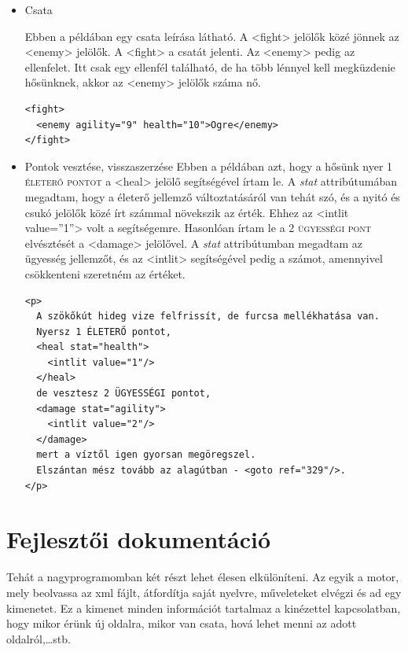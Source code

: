 \documentclass[12pt,a4paper,oneside]{report}
\newcommand{\xtag}[1]{{\color{Tag}#1}}
\newcommand{\stat}{\textsc}
\newcommand{\attr}{\emph}
\begin{document}
\begin{itemize}
      \item Csata
      
        Ebben a példában egy csata leírása látható. A
        <\xtag{fight}> jelölők közé jönnek az
        <\xtag{enemy}> jelölők. A <\xtag{fight}> a csatát
        jelenti. Az <\xtag{enemy}> pedig az ellenfelet. Itt csak egy ellenfél
        található, de ha több lénnyel kell megküzdenie hősünknek,
        akkor az <\xtag{enemy}> jelölők száma nő.
        \begin{verbatim}
<fight>
  <enemy agility="9" health="10">Ogre</enemy>
</fight>
        \end{verbatim}

      \item Pontok vesztése, visszaszerzése
        Ebben a példában azt, hogy a hősünk nyer 1 \stat{életerő pontot} a
        <\xtag{heal}> jelölő segítségével írtam le. A \attr{stat}
        attribútumában megadtam, hogy a életerő jellemző
        változtatásáról van tehát szó, és a nyitó és csukó jelölők közé írt
        számmal növekszik az érték. Ehhez az <\xtag{intlit}
        {\color{Attr}value}={\color{Value}''1''}> volt a segítségemre.
        Hasonlóan írtam le a 2 \stat{ügyességi pont} elvésztését a <\xtag{damage}>
        jelölővel. A \attr{stat} attribútumban megadtam az ügyesség
        jellemzőt, és az <\xtag{intlit}> segítségével pedig a számot,
        amennyivel csökkenteni szeretném az értéket.
        \begin{verbatim}
<p>
  A szökőkút hideg vize felfrissít, de furcsa mellékhatása van. 
  Nyersz 1 ÉLETERŐ pontot,
  <heal stat="health">
    <intlit value="1"/>
  </heal>      
  de vesztesz 2 ÜGYESSÉGI pontot,
  <damage stat="agility">
    <intlit value="2"/>
  </damage>            
  mert a víztől igen gyorsan megöregszel.
  Elszántan mész tovább az alagútban - <goto ref="329"/>.
</p>
        \end{verbatim}
    \end{itemize}
    
  \section{Fejlesztői dokumentáció}
    Tehát a nagyprogramomban két részt lehet élesen elkülöníteni. Az
    egyik a motor, mely beolvassa az xml fájlt, átfordítja saját
    nyelvre, műveleteket elvégzi és ad egy kimenetet. Ez a kimenet
    minden információt tartalmaz a kinézettel kapcsolatban, hogy
    mikor érünk új oldalra, mikor van csata, hová lehet menni az
    adott oldalról,\dots stb. 
\end{document}

